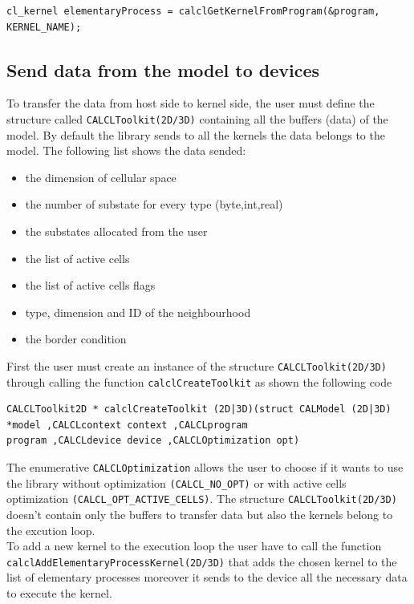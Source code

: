 \begin{lstlisting}
cl_kernel elementaryProcess = calclGetKernelFromProgram(&program,
KERNEL_NAME);
\end{lstlisting}


\subsection{Send data from the model to devices}

To transfer the data from host side to kernel side, the user must define the
 structure called \verb'CALCLToolkit(2D/3D)' containing all the buffers (data) of the
model.
By default the library sends to all the kernels the data belongs to the model. The following list shows the
data sended:
\begin{itemize}
	\item the dimension of cellular space 
	\item the number of substate for every type (byte,int,real) 
	\item the substates allocated from the user
	\item the list of active cells
	\item the list of active cells flags
	\item type, dimension and ID of the neighbourhood
	\item the border condition
\end{itemize}


 First the user must create an
instance of the structure \verb'CALCLToolkit(2D/3D)' through calling the function
\verb'calclCreateToolkit' as shown the following code
\begin{lstlisting}
CALCLToolkit2D * calclCreateToolkit (2D|3D)(struct CALModel (2D|3D) *model ,CALCLcontext context ,CALCLprogram
program ,CALCLdevice device ,CALCLOptimization opt)
\end{lstlisting}
The enumerative \verb'CALCLOptimization' allows the user to choose if it wants to use
the library without optimization \verb|(CALCL_NO_OPT)| or with active cells optimization
 \verb|(CALCL_OPT_ACTIVE_CELLS)|. The structure \verb'CALCLToolkit(2D/3D)'
doesn't contain only the buffers to transfer data but also the kernels belong to the
excution loop. \\
To add a new kernel to the execution loop the user have to call the function \verb'calclAddElementaryProcessKernel(2D/3D)' that
adds the chosen kernel to the list of elementary processes moreover it sends to
the device all the necessary data to execute the kernel.

